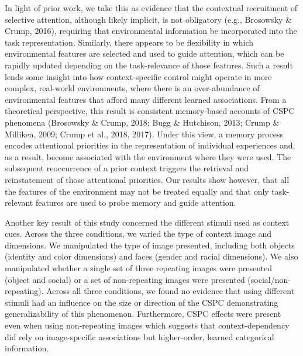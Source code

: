 \documentclass[english,,man,floatsintext]{apa6}
\begin{document}
In light of prior work, we take this as evidence that the contextual
recruitment of selective attention, although likely implicit, is not
obligatory (e.g., Brosowsky \& Crump, 2016), requiring that
environmental information be incorporated into the task representation.
Similarly, there appears to be flexibility in which environmental
features are selected and used to guide attention, which can be rapidly
updated depending on the task-relevance of those features. Such a result
lends some insight into how context-specific control might operate in
more complex, real-world environments, where there is an over-abundance
of environmental features that afford many different learned
associations. From a theoretical perspective, this result is consistent
memory-based accounts of CSPC phenomena (Brosowsky \& Crump, 2018; Bugg
\& Hutchison, 2013; Crump \& Milliken, 2009; Crump et al., 2018, 2017).
Under this view, a memory process encodes attentional priorities in the
representation of individual experiences and, as a result, become
associated with the environment where they were used. The subsequent
reoccurrence of a prior context triggers the retrieval and reinstatement
of those attentional priorities. Our results show however, that all the
features of the environment may not be treated equally and that only
task-relevant features are used to probe memory and guide attention.

Another key result of this study concerned the different stimuli used as
context cues. Across the three conditions, we varied the type of context
image and dimensions. We manipulated the type of image presented,
including both objects (identity and color dimensions) and faces (gender
and racial dimensions). We also manipulated whether a single set of
three repeating images were presented (object and social) or a set of
non-repeating images were presented (social/non-repeating). Across all
three conditions, we found no evidence that using different stimuli had
an influence on the size or direction of the CSPC demonstrating
generalizability of this phenomenon. Furthermore, CSPC effects were
present even when using non-repeating images which suggests that
context-dependency did rely on image-specific associations but
higher-order, learned categorical information.
\end{document}
